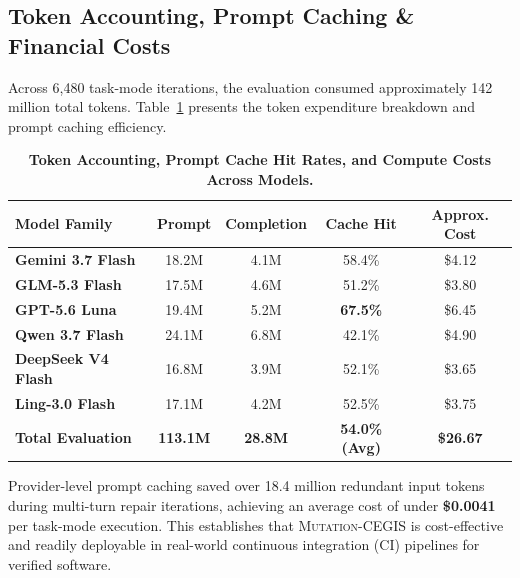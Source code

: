 \documentclass{article}
\begin{document}
\subsection{Token Accounting, Prompt Caching \& Financial Costs}

Across 6,480 task-mode iterations, the evaluation consumed approximately 142 million total tokens. Table~\ref{tab:token_economics} presents the token expenditure breakdown and prompt caching efficiency.

\begin{table}[H]
\centering
\caption{\textbf{Token Accounting, Prompt Cache Hit Rates, and Compute Costs Across Models.}}
\label{tab:token_economics}
\setlength{\tabcolsep}{6pt}
\begin{tabular}{lcccc}
\toprule
\textbf{Model Family} & \textbf{Prompt} & \textbf{Completion} & \textbf{Cache Hit} & \textbf{Approx. Cost} \\
\midrule
\textbf{Gemini 3.7 Flash} & 18.2M & 4.1M & 58.4\% & \$4.12 \\
\textbf{GLM-5.3 Flash} & 17.5M & 4.6M & 51.2\% & \$3.80 \\
\textbf{GPT-5.6 Luna} & 19.4M & 5.2M & \textbf{67.5\%} & \$6.45 \\
\textbf{Qwen 3.7 Flash} & 24.1M & 6.8M & 42.1\% & \$4.90 \\
\textbf{DeepSeek V4 Flash} & 16.8M & 3.9M & 52.1\% & \$3.65 \\
\textbf{Ling-3.0 Flash} & 17.1M & 4.2M & 52.5\% & \$3.75 \\
\midrule
\textbf{Total Evaluation} & \textbf{113.1M} & \textbf{28.8M} & \textbf{54.0\% (Avg)} & \textbf{\$26.67} \\
\bottomrule
\end{tabular}
\end{table}

Provider-level prompt caching saved over 18.4 million redundant input tokens during multi-turn repair iterations, achieving an average cost of under \textbf{\$0.0041} per task-mode execution. This establishes that \textsc{Mutation-CEGIS} is cost-effective and readily deployable in real-world continuous integration (CI) pipelines for verified software.

\clearpage

\end{document}
